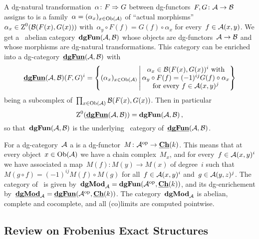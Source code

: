 \documentclass[a4paper,10pt]{scrartcl}
\begin{document}
A dg-natural transformation~$\alpha \colon F \Rightarrow G$ between dg-functors~$F, G \colon \mathcal{A} \to \mathcal{B}$ assigns to is a family~$\alpha = (\alpha_x)_{x \in \operatorname{Ob}(\mathcal{A})}$ of \enquote{actual morphisms}~$\alpha_x \in \operatorname{Z}^0(\mathcal{B}(F(x), G(x)))$ with~$\alpha_y \circ F(f) = G(f) \circ \alpha_x$ for every~$f \in \mathcal{A}(x,y)$.
We get a~{\klinear} abelian category~$\mathbf{dgFun}(\mathcal{A}, \mathcal{B})$ whose objects are dg-functors~$\mathcal{A} \to \mathcal{B}$ and whose morphisms are dg-natural transformations.
This category can be enriched into a dg-category~$\underline{\smash{\mathbf{dgFun}}}(\mathcal{A}, \mathcal{B})$ with
\[
  \dgdgFun(\Acat, \Bcat)(F,G)^i
  =
  \left\{
    (\alpha_x)_{x \in \Ob(\Acat)}
  \suchthat*
    \begin{tabular}{@{}c@{}}
      $\alpha_x \in \Bcat(F(x), G(x))^i$ with \\
      $\alpha_y \circ F(f) = (-1)^{ij} G(f) \circ \alpha_x$ \\
      for every~$f \in \Acat(x,y)^j$
    \end{tabular}
  \right\}
\]
being a subcomplex of~$\prod_{x \in \operatorname{Ob}(\mathcal{A})} \mathcal{B}(F(x), G(x))$.
Then in particular
\[
  \operatorname{Z}^0(\underline{\smash{\mathbf{dgFun}}}(\mathcal{A}, \mathcal{B}))
  =
  \mathbf{dgFun}(\mathcal{A}, \mathcal{B}) \,,
\]
so that~$\mathbf{dgFun}(\mathcal{A}, \mathcal{B})$ is the underlying~{\klinear} category of~$\underline{\smash{\mathbf{dgFun}}}(\mathcal{A}, \mathcal{B})$.

For a dg-category~$\Acat$ a  is a dg-functor~$M \colon \mathcal{A}^{{\mathrm{op}}} \to \underline{\mathbf{Ch}}(k)$.
This means that at every object~$x \in \operatorname{Ob}(\mathcal{A})$ we have a chain complex~$M_x$, and for every~$f \in \mathcal{A}(x,y)^i$ we have associated a map~$M(f) \colon M(y) \to M(x)$ of degree~$i$ such that~$M(g \circ f) = (-1)^{ij} M(f) \circ M(g)$ for all~$f \in \mathcal{A}(x,y)^i$ and~$g \in \mathcal{A}(y,z)^j$.
The category of~{\dgmodules{$\Acat$}} is given by~$\mathbf{dgMod}_{\mathcal{A}} = \mathbf{dgFun}(\mathcal{A}^{{\mathrm{op}}}, \underline{\mathbf{Ch}}(k))$, and its dg-enrichement by~$\underline{\smash{\mathbf{dgMod}}}_{\mathcal{A}} = \underline{\smash{\mathbf{dgFun}}}(\mathcal{A}^{{\mathrm{op}}}, \underline{\mathbf{Ch}}(k))$.
The category~$\mathbf{dgMod}_{\mathcal{A}}$ is abelian, complete and cocomplete, and all (co)limits are computed pointwise.



\subsection{Review on Frobenius Exact Structures}
\end{document}
